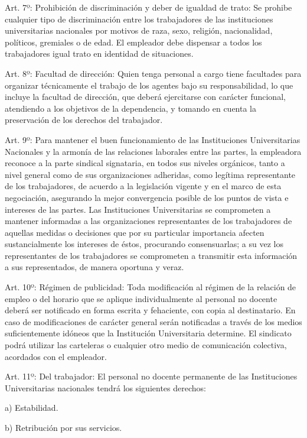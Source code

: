 \documentclass[]{article}
\begin{document}
Art. 7º: Prohibición de discriminación y deber de igualdad de trato: Se
prohibe cualquier tipo de discriminación entre los trabajadores de las
instituciones universitarias nacionales por motivos de raza, sexo,
religión, nacionalidad, políticos, gremiales o de edad. El empleador
debe dispensar a todos los trabajadores igual trato en identidad de
situaciones.

Art. 8º: Facultad de dirección: Quien tenga personal a cargo tiene
facultades para organizar técnicamente el trabajo de los agentes bajo su
responsabilidad, lo que incluye la facultad de dirección, que deberá
ejercitarse con carácter funcional, atendiendo a los objetivos de la
dependencia, y tomando en cuenta la preservación de los derechos del
trabajador.

Art. 9º: Para mantener el buen funcionamiento de las Instituciones
Universitarias Nacionales y la armonía de las relaciones laborales entre
las partes, la empleadora reconoce a la parte sindical signataria, en
todos sus niveles orgánicos, tanto a nivel general como de sus
organizaciones adheridas, como legítima representante de los
trabajadores, de acuerdo a la legislación vigente y en el marco de esta
negociación, asegurando la mejor convergencia posible de los puntos de
vista e intereses de las partes. Las Instituciones Universitarias se
comprometen a mantener informadas a las organizaciones representantes de
los trabajadores de aquellas medidas o decisiones que por su particular
importancia afecten sustancialmente los intereses de éstos, procurando
consensuarlas; a su vez los representantes de los trabajadores se
comprometen a transmitir esta información a sus representados, de manera
oportuna y veraz.

Art. 10º: Régimen de publicidad: Toda modificación al régimen de la
relación de empleo o del horario que se aplique individualmente al
personal no docente deberá ser notificado en forma escrita y fehaciente,
con copia al destinatario. En caso de modificaciones de carácter general
serán notificadas a través de los medios suficientemente idóneos que la
Institución Universitaria determine. El sindicato podrá utilizar las
carteleras o cualquier otro medio de comunicación colectiva, acordados
con el empleador.

Art. 11º: Del trabajador: El personal no docente permanente de las
Instituciones Universitarias nacionales tendrá los siguientes derechos:

a) Estabilidad.

b) Retribución por sus servicios.
\end{document}
